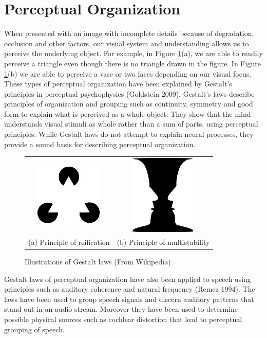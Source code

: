 \section*{Perceptual Organization}

When presented with an image with incomplete details because of degradation, occlusion and other factors, our visual system and understanding allows us to perceive the underlying object. For example, in Figure \ref{fig1}(a), we are able to readily perceive a triangle even though there is no triangle drawn in the figure. In Figure \ref{fig1}(b) we are able to perceive a vase or two faces depending on our visual focus. These types of perceptual organization have been explained by Gestalt’s principles in perceptual psychophysics (Goldstein 2009). Gestalt’s laws describe principles of organization and grouping such as continuity, symmetry and good form to explain what is perceived as a whole object. They show that the mind understands visual stimuli as whole rather than a sum of parts, using perceptual principles. While Gestalt laws do not attempt to explain neural processes, they provide a sound basis for describing perceptual organization. 

\begin{figure}[H]
\centering

\begin{tabular}[t]{cc}
\includegraphics[scale=1.3]{figures/1.eps} & \includegraphics{figures/2.eps}\\[5pt]
(a) Principle of reification & (b) Principle of multistability
\end{tabular}

\caption{Illustrations of Gestalt laws (From Wikipedia)}\label{fig1}
\end{figure}

Gestalt laws of perceptual organization have also been applied to speech using principles such as auditory coherence and natural frequency (Remez 1994). The laws have been used to group speech signals and discern auditory patterns that stand out in an audio stream. Moreover they have been used to determine possible physical sources such as cochlear distortion that lead to perceptual grouping of speech.


